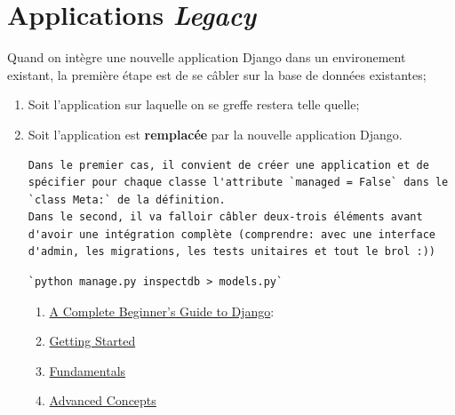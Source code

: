 \documentclass[11pt]{amsbook}
\begin{document}
\begin{verbatim}

\end{verbatim}

\hypertarget{x-applications-\emph{legacy}}{\chapter{Applications \emph{Legacy}}}
Quand on intègre une nouvelle application Django dans un environement existant, la première étape est de se câbler sur la base de données existantes;


\begin{enumerate}

\item{Soit l’application sur laquelle on se greffe restera telle quelle;}

\item{Soit l’application est \textbf{remplacée} par la nouvelle application Django.}

\begin{verbatim}
Dans le premier cas, il convient de créer une application et de spécifier pour chaque classe l'attribute `managed = False` dans le `class Meta:` de la définition.
Dans le second, il va falloir câbler deux-trois éléments avant d'avoir une intégration complète (comprendre: avec une interface d'admin, les migrations, les tests unitaires et tout le brol :))
\end{verbatim}

\begin{verbatim}
`python manage.py inspectdb > models.py`
\end{verbatim}

\begin{enumerate}

\item{\href{https://simpleisbetterthancomplex.com/series/beginners-guide/1.11/}{A Complete Beginner’s Guide to Django}:}

\item{\href{https://simpleisbetterthancomplex.com/series/2017/09/04/a-complete-beginners-guide-to-django-part-1.html}{Getting Started}}

\item{\href{https://simpleisbetterthancomplex.com/series/2017/09/11/a-complete-beginners-guide-to-django-part-2.html}{Fundamentals}}

\item{\href{https://simpleisbetterthancomplex.com/series/2017/09/18/a-complete-beginners-guide-to-django-part-3.html}{Advanced Concepts}}


\end{enumerate}
\end{enumerate}
\end{document}
